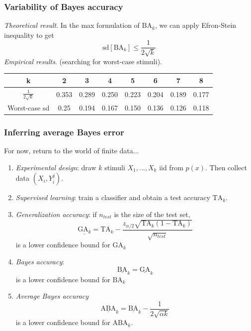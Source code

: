 \documentclass{beamer}
\begin{document}
\begin{frame}
\frametitle{Variability of Bayes accuracy}

\emph{Theoretical result}. In the max formulation of $\text{BA}_k$, we
can apply Efron-Stein inequality to get
\[
\text{sd}[\text{BA}_k] \leq \frac{1}{2\sqrt{k}}
\]
\vspace{0.2in}
\emph{Empirical results}. (searching for worst-case stimuli).
\begin{tabular}{c||c|c|c|c|c|c|c}
k & 2 & 3 & 4 & 5 & 6 & 7 & 8\\\hline
$\frac{1}{2\sqrt{k}}$ & 0.353 & 0.289 & 0.250 & 0.223 & 0.204 & 0.189 & 0.177\\\hline
Worst-case sd & 0.25 & 0.194 & 0.167 & 0.150 & 0.136 & 0.126 & 0.118
\end{tabular}
\end{frame}

\begin{frame}
\frametitle{Inferring average Bayes error}
For now, return to the world of finite data...
\begin{enumerate}
\item \emph{Experimental design}: draw $k$ stimuli $X_1,...,X_k$ iid from $p(x)$.  Then collect data $(X_i, Y_i^j)$.
\item \emph{Supervised learning}: train a classifier and obtain a test accuracy $\text{TA}_k$.
\item \emph{Generalization accuracy}: if $n_{test}$ is the size of the test set,
\[
\underline{\text{GA}_k} = \text{TA}_k - \frac{z_{\alpha/2}\sqrt{\text{TA}_k (1-\text{TA}_k)}}{\sqrt{n_{test}}}
\]
 is a lower confidence bound for $\text{GA}_k$
\item \emph{Bayes accuracy}:
\[
\underline{\text{BA}}_k =  \underline{\text{GA}}_k
\]
is a lower confidence bound for $\text{BA}_k$
\item \emph{Average Bayes accuracy}
\[
\underline{\text{ABA}}_k =  \underline{\text{BA}}_k - \frac{1}{2\sqrt{\alpha k}}
\]
is a lower confidence bound for $\text{ABA}_k$.
\end{enumerate}
\end{frame}
\end{document}
